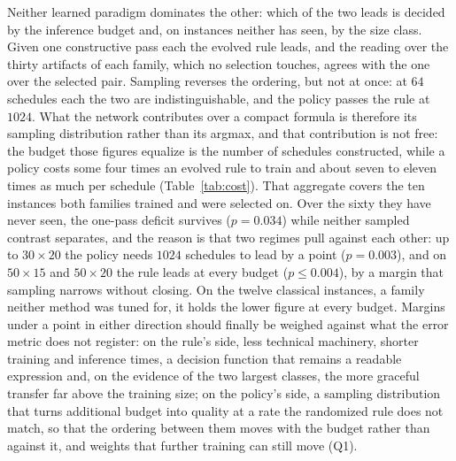 \documentclass[preprint,12pt]{elsarticle}
\theoremstyle{definition}
\theoremstyle{remark}
\begin{document}
Neither learned paradigm dominates the other: which of the two leads
is decided by the inference budget and, on instances neither has
seen, by the size class.
Given one constructive pass each the evolved rule leads, and the
reading over the thirty artifacts of each family, which no selection
touches, agrees with the one over the selected pair. Sampling
reverses the ordering, but not at once: at $64$ schedules each the
two are indistinguishable, and the policy passes the rule at $1024$.
What the network contributes over a compact formula is
therefore its sampling distribution rather than its argmax, and that
contribution is not free: the budget those figures equalize is the
number of schedules constructed, while a policy costs some four times
an evolved rule to train and about seven to eleven times as much per
schedule (Table~\ref{tab:cost}).
That aggregate covers the ten instances both families trained and
were selected on. Over the sixty they have never seen, the one-pass
deficit survives ($p=0.034$) while neither sampled contrast
separates, and the reason is that two regimes pull against each
other: up to $30{\times}20$ the policy needs $1024$ schedules to lead
by a point ($p=0.003$), and on $50{\times}15$ and $50{\times}20$ the
rule leads at every budget ($p\le0.004$), by a margin that sampling
narrows without closing. On the twelve
classical instances, a family neither method was tuned for, it holds
the lower figure at every budget. Margins under a point in either
direction should finally be weighed against what the error metric
does not register: on the rule's side, less technical machinery,
shorter training and inference times, a decision function that
remains a readable expression and, on the evidence of the two largest
classes, the more graceful transfer far above the training size; on
the policy's side, a sampling distribution that turns additional
budget into quality at a rate the randomized rule does not match, so
that the ordering between them moves with the budget rather than
against it, and weights that further training can still move (Q1).
\end{document}
